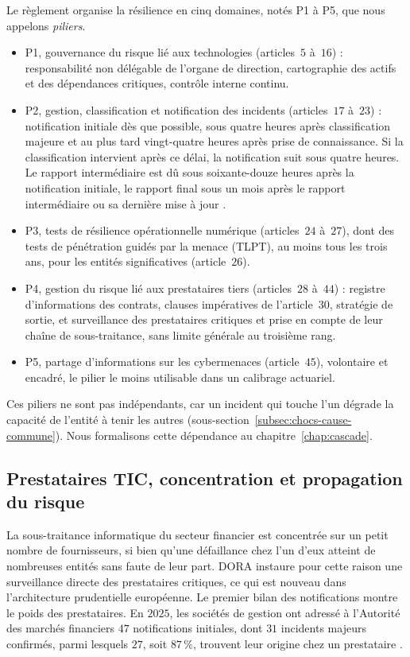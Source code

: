 Le règlement organise la résilience en cinq domaines, notés P1 à P5, que nous appelons \emph{piliers}.
\begin{itemize}[leftmargin=1.4em,itemsep=2pt]
\item P1, gouvernance du risque lié aux technologies (articles~$5$ à~$16$) : responsabilité non
      délégable de l'organe de direction, cartographie des actifs et des dépendances critiques,
      contrôle interne continu.
\item P2, gestion, classification et notification des incidents (articles~$17$ à~$23$) : notification initiale dès que possible, sous quatre heures après classification majeure et au plus tard vingt-quatre heures après prise de connaissance. Si la classification intervient après ce délai, la notification suit sous quatre heures. Le rapport intermédiaire est dû sous soixante-douze heures après la notification initiale, le rapport final sous un mois après le rapport intermédiaire ou sa dernière mise à jour \citep{eu2025_301}.
\item P3, tests de résilience opérationnelle numérique (articles~$24$ à~$27$), dont des tests de
      pénétration guidés par la menace (TLPT), au moins tous les trois ans, pour les entités
      significatives (article~$26$).
\item P4, gestion du risque lié aux prestataires tiers (articles~$28$ à~$44$) : registre
      d'informations des contrats, clauses impératives de l'article~$30$, stratégie de sortie, et
      surveillance des prestataires critiques et prise en compte de leur chaîne de sous-traitance, sans limite générale au troisième rang.
\item P5, partage d'informations sur les cybermenaces (article~$45$), volontaire et encadré, le
      pilier le moins utilisable dans un calibrage actuariel.
\end{itemize}
Ces piliers ne sont pas indépendants, car un incident qui touche l'un dégrade la capacité de l'entité à tenir les autres (sous-section~\ref{subsec:chocs-cause-commune}). Nous formalisons cette dépendance au chapitre~\ref{chap:cascade}.

\subsection{Prestataires TIC, concentration et propagation du risque}
\label{subsec:risque-tiers-dora}

La sous-traitance informatique du secteur financier est concentrée sur un petit nombre de
fournisseurs, si bien qu'une défaillance chez l'un d'eux atteint de nombreuses entités sans faute de
leur part. DORA instaure pour cette raison une surveillance directe des prestataires critiques, ce qui
est nouveau dans l'architecture prudentielle européenne. Le premier bilan des notifications montre
le poids des prestataires. En $2025$, les sociétés de gestion ont adressé à l'Autorité des marchés
financiers $47$ notifications initiales, dont $31$ incidents majeurs confirmés, parmi lesquels $27$,
soit $87\,\%$, trouvent leur origine chez un prestataire \citep{amf2026incidents}.

